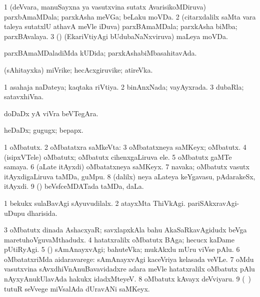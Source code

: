 \bentry
{}
\gl{\nA}
\bmng
\bnum
\num{1} (deVvara, manuSayxna ya vasutxvina sutatx AvarisikoMDiruva) parxbAmaMDala; parxkAsha meVGa; beLaku moVDa. 
\num{2} (citarxdalilx saMta \mo vara taleya sutatxlU athavA meVle iDuva) parxBAmaMDala; parxkAsha biMba; parxBAvalaya. 
\num{3} (\pashA) (EkariVtiyAgi bUdubaNaNxviruva) maLeya moVDa. 
\enum
\emng
\eentry

\bentry
{}
\gl{\gu}
\bmng
parxBAmaMDaladiMda kUDida; parxkAshabiMbasahitavAda. 
\emng
\eentry

\bentry
{}
\gl{\nA}
\bmng
(sAhitayxka) miVrike; hecAcxgiruvike; atireVka. 
\emng
\eentry

\bentry
{}
\gl{\gu}
\bmng
\bnum
\num{1} asahaja naDateya; kaqtaka riVtiya. 
\num{2} binAnxNada; vayAyxrada. 
\num{3} dubaRla; satavxhiVna. 
\enum
\emng
\eentry

\bentry
{}
\gl{\nA}
\bmng
doDaDx yA viVra beVTegAra. 
\emng
\eentry

\bentry
{}
\gl{\nA}
\bmng
heDaDx; gugugx; bepapx. 
\emng
\eentry

\bentry
{}
\gl{\nA}
\bmng
\bnum
\num{1} oMbatutx. 
\num{2} oMbatatxra saMkeVta:  
\num{3} oMbatatxneya saMKeyx; oMbatutx. 
\num{4} (isipxVTele) oMbatutx; oMbatutx cihenxgaLiruva ele. 
\num{5} oMbatutx gaMTe samaya. 
\num{6} (aLate itAyxdi) oMbatatxneya saMKeyx. 
\num{7} navaka; oMbatutx vasutx itAyxdigaLiruva taMDa, guMpu. 
\num{8} (\bava dalilx) neya aLateya keYgavasu, pAdarakeSx, itAyxdi. 
\num{9} (\ame) beVsfceMDATada taMDa, daLa. 
\enum
\emng

\noindent
\gl{\pagu}
\bmng
\bnum
\num{1}  bekukx sulaBavAgi sAyuvudilalx. 
\num{2}  atayxMta ThiVkAgi. pariSAkxravAgi-uDupu dharisida. 
\num{3}  oMbatutx dinada AshacxyaR; savxlapxkAla bahu AkaSaRkavAgidudx beVga maretuhoVguvaMthadudx. 
\num{4}  hatatxralilx oMbatutx BAga; hecucx kaDame pUtiRyAgi. 
\num{5}  (\birx) sAmAnayxvAgi; bahuteVka; mukAkxlu mUru viVse pAlu. 
\num{6}  oMbatatxriMda aidaravarege: sAmAnayxvAgi kaceVriya kelasada veVLe. 
\num{7}  oMdu vasutxvina sAvxdhiVnAnuBavavidadxre adara meVle hatatxralilx oMbatutx pAlu nAyxyAnukUlavAda hakukx idadxMteyeV. 
\num{8}  oMbatutx kAvayx deVviyaru. 
\num{9} (\birx\ ) tutuR seVvege miVsalAda dUravANi saMKeyx. 
\enum
\emng
\eentry

